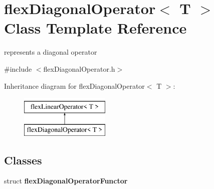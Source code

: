 \hypertarget{classflex_diagonal_operator}{}\section{flex\+Diagonal\+Operator$<$ T $>$ Class Template Reference}
\label{classflex_diagonal_operator}


represents a diagonal operator  




{\ttfamily \#include $<$flex\+Diagonal\+Operator.\+h$>$}

Inheritance diagram for flex\+Diagonal\+Operator$<$ T $>$\+:\begin{figure}[H]
\begin{center}
\leavevmode
\includegraphics[height=2.000000cm]{classflex_diagonal_operator}
\end{center}
\end{figure}
\subsection*{Classes}
\begin{DoxyCompactItemize}
\item 
struct {\bfseries flex\+Diagonal\+Operator\+Functor}
\end{DoxyCompactItemize}
